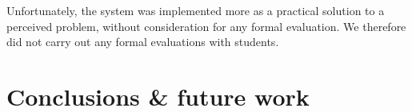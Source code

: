 \documentclass[sigconf, authordraft, capitalise]{acmart}
\begin{document}
Unfortunately, the system was implemented more as a practical solution to a perceived problem, without consideration for any formal evaluation. We therefore did not carry out any formal evaluations with students.



\section{Conclusions \& future work}
\label{sec-conclusion}

\newpage\mbox{}\newpage


\end{document}
